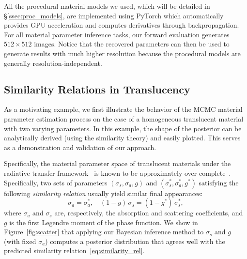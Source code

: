 All the procedural material models we used, which will be detailed in \S\ref{ssec:proc_models}, are implemented using PyTorch which %
automatically provides GPU acceleration and computes derivatives through backpropagation. %
For all material parameter inference tasks, our forward evaluation generates $512 \times 512$ images.
Notice that the recovered parameters can then be used to generate results with much higher resolution because the procedural models are generally resolution-independent.




\subsection{Similarity Relations in Translucency}

As a motivating example, we first illustrate the behavior of the MCMC material parameter estimation process on the case of a homogeneous translucent material with two varying parameters.
In this example, the shape of the posterior can be analytically derived (using the similarity theory) and easily plotted. This serves as a demonstration and validation of our approach.

Specifically, the material parameter space of translucent materials under the radiative transfer framework~\cite{chandrasekhar1960radiative} is known to be approximately over-complete~\cite{Zhao:2014:HSR}.
Specifically, two sets of parameters $(\sigma_s, \sigma_a, g)$ and $(\sigma_s^*, \sigma_a^*, g^*)$ satisfying the following \emph{similarity relation} usually yield similar final appearances:
%
\begin{equation}
	\label{eq:similarity_rel}
	\sigma_a = \sigma_a^*, \quad (1 - g)\,\sigma_s = (1 - g^*)\,\sigma_s^*,
\end{equation}
%
where $\sigma_a$ and $\sigma_s$ are, respectively, the absorption and scattering coefficients, and $g$ is the first Legendre moment of the phase function.
We show in Figure~\ref{fig:scatter} that applying our Bayesian inference method to $\sigma_s$ and $g$ (with fixed $\sigma_a$) computes a posterior distribution that agrees well with the predicted similarity relation~\eqref{eq:similarity_rel}.

